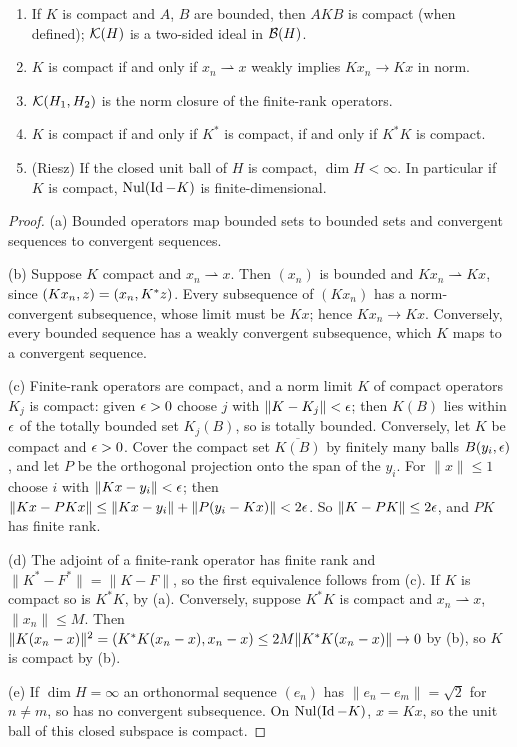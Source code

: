\begin{proposition}\label{hilbert:prop:compact}
\begin{enumerate}[label=\textup{(\alph*)}]
\item If $K$ is compact and $A$, $B$ are bounded, then $AKB$ is compact (when defined);
$\mathcal{K}(H)$ is a two-sided ideal in $\mathcal{B}(H)$.
\item $K$ is compact if and only if $x_n\rightharpoonup x$ weakly implies $Kx_n\to Kx$ in norm.
\item $\mathcal{K}(H_1,H_2)$ is the norm closure of the finite-rank operators.
\item $K$ is compact if and only if $K^*$ is compact, if and only if $K^*K$ is compact.
\item \textup{(Riesz)} If the closed unit ball of $H$ is compact, $\dim H<\infty$. In particular
if $K$ is compact, $\operatorname{Nul}(\operatorname{Id}-K)$ is finite-dimensional.
\end{enumerate}
\end{proposition}
\begin{proof}
(a) Bounded operators map bounded sets to bounded sets and convergent sequences to
convergent sequences.

(b) Suppose $K$ compact and $x_n\rightharpoonup x$. Then $(x_n)$ is bounded and $Kx_n\rightharpoonup Kx$,
since $( Kx_n, z)=( x_n, K^*z)$. Every subsequence of $(Kx_n)$ has a norm-convergent
subsequence, whose limit must be $Kx$; hence $Kx_n\to Kx$. Conversely, every bounded sequence
has a weakly convergent subsequence, which $K$ maps to a convergent sequence.

(c) Finite-rank operators are compact, and a norm limit $K$ of compact operators $K_j$ is
compact: given $\epsilon>0$ choose $j$ with $\|K-K_j\|<\epsilon$; then $K(B)$ lies within $\epsilon$ of the
totally bounded set $K_j(B)$, so is totally bounded. Conversely, let $K$ be compact and $\epsilon>0$.
Cover the compact set $\overline{K(B)}$ by finitely many balls $B(y_i,\epsilon)$, and let $P$ be the
orthogonal projection onto the span of the $y_i$. For $\|x\|\le1$ choose $i$ with
$\|Kx-y_i\|<\epsilon$; then $\|Kx-PKx\|\le\|Kx-y_i\|+\|P(y_i-Kx)\|<2\epsilon$. So $\|K-PK\|\le2\epsilon$, and
$PK$ has finite rank.

(d) The adjoint of a finite-rank operator has finite rank and $\|K^*-F^*\|=\|K-F\|$, so the
first equivalence follows from (c). If $K$ is compact so is $K^*K$, by (a). Conversely,
suppose $K^*K$ is compact and $x_n\rightharpoonup x$, $\|x_n\|\le M$. Then
$\|K(x_n-x)\|^2=( K^*K(x_n-x), x_n-x)\le2M\|K^*K(x_n-x)\|\to0$ by (b), so $K$ is compact by (b).

(e) If $\dim H=\infty$ an orthonormal sequence $(e_n)$ has $\|e_n-e_m\|=\sqrt2$ for $n\ne m$, so
has no convergent subsequence. On $\operatorname{Nul}(\operatorname{Id}-K)$, $x=Kx$, so the unit ball of this closed
subspace is compact.
\end{proof}

